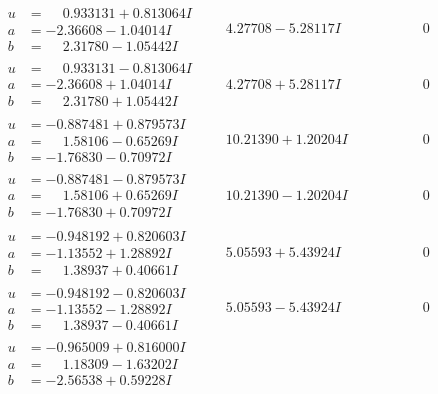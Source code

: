 \documentclass[1p]{elsarticle_modified}
\theoremstyle{definition}
\begin{document}
$$\begin{array}{c|c|c}
 \hline 
\begin{aligned}
u &= \phantom{-}0.933131 + 0.813064 I \\
a &= -2.36608 - 1.04014 I \\
b &= \phantom{-}2.31780 - 1.05442 I\end{aligned}
 & \phantom{-}4.27708 - 5.28117 I & \phantom{-0.000000 } 0 \\ \hline\begin{aligned}
u &= \phantom{-}0.933131 - 0.813064 I \\
a &= -2.36608 + 1.04014 I \\
b &= \phantom{-}2.31780 + 1.05442 I\end{aligned}
 & \phantom{-}4.27708 + 5.28117 I & \phantom{-0.000000 } 0 \\ \hline\begin{aligned}
u &= -0.887481 + 0.879573 I \\
a &= \phantom{-}1.58106 - 0.65269 I \\
b &= -1.76830 - 0.70972 I\end{aligned}
 & \phantom{-}10.21390 + 1.20204 I & \phantom{-0.000000 } 0 \\ \hline\begin{aligned}
u &= -0.887481 - 0.879573 I \\
a &= \phantom{-}1.58106 + 0.65269 I \\
b &= -1.76830 + 0.70972 I\end{aligned}
 & \phantom{-}10.21390 - 1.20204 I & \phantom{-0.000000 } 0 \\ \hline\begin{aligned}
u &= -0.948192 + 0.820603 I \\
a &= -1.13552 + 1.28892 I \\
b &= \phantom{-}1.38937 + 0.40661 I\end{aligned}
 & \phantom{-}5.05593 + 5.43924 I & \phantom{-0.000000 } 0 \\ \hline\begin{aligned}
u &= -0.948192 - 0.820603 I \\
a &= -1.13552 - 1.28892 I \\
b &= \phantom{-}1.38937 - 0.40661 I\end{aligned}
 & \phantom{-}5.05593 - 5.43924 I & \phantom{-0.000000 } 0 \\ \hline\begin{aligned}
u &= -0.965009 + 0.816000 I \\
a &= \phantom{-}1.18309 - 1.63202 I \\
b &= -2.56538 + 0.59228 I\end{aligned}

\end{array}$$
\end{document}
